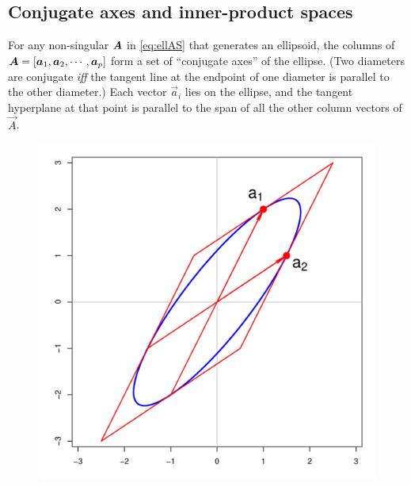 \subsection{Conjugate axes and inner-product spaces}\label{sec:conjugate}

For any non-singular $\bm{A}$ in \eqref{eq:ellAS} that generates an ellipsoid,  %
the columns of
$\bm{A}=\left[
   \bm{a}_{1}, \bm{a}_{2}, \cdots, \bm{a}_{p}  \\
\right]
$
form a set of ``conjugate axes'' of the ellipse. (Two diameters are conjugate \emph{iff}
the tangent line at the endpoint of one diameter is parallel to the other diameter.)
Each vector
$\vec{a}_{i}$
lies on the ellipse, and the tangent hyperplane at that point is parallel to the span of all the other column vectors of
$\vec{A}$.
\begin{figure}[htb]
 \begin{minipage}[b]{.49\linewidth}
  \centering
  \includegraphics[width=1\linewidth]{fig/conjugate1}
 \end{minipage}%
 \hfill
 \begin{minipage}[b]{.49\linewidth}
  \centering

\end{minipage}
\end{figure}
